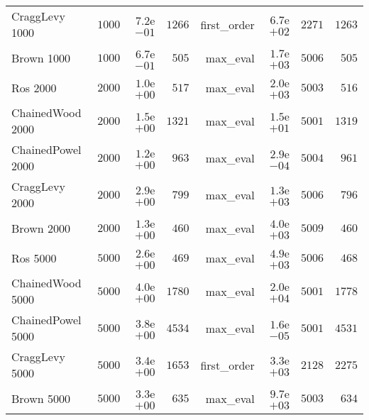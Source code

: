 \begin{longtable}[c]{lrrrrrrr}
CraggLevy 1000 & \( 1000\) & \( 7.2\)e\(-01\) & \( 1266\) & first\_order & \( 6.7\)e\(+02\) & \( 2271\) & \( 1263\) \\
Brown 1000 & \( 1000\) & \( 6.7\)e\(-01\) & \(  505\) & max\_eval & \( 1.7\)e\(+03\) & \( 5006\) & \(  505\) \\
Ros 2000 & \( 2000\) & \( 1.0\)e\(+00\) & \(  517\) & max\_eval & \( 2.0\)e\(+03\) & \( 5003\) & \(  516\) \\
ChainedWood 2000 & \( 2000\) & \( 1.5\)e\(+00\) & \( 1321\) & max\_eval & \( 1.5\)e\(+01\) & \( 5001\) & \( 1319\) \\
ChainedPowel 2000 & \( 2000\) & \( 1.2\)e\(+00\) & \(  963\) & max\_eval & \( 2.9\)e\(-04\) & \( 5004\) & \(  961\) \\
CraggLevy 2000 & \( 2000\) & \( 2.9\)e\(+00\) & \(  799\) & max\_eval & \( 1.3\)e\(+03\) & \( 5006\) & \(  796\) \\
Brown 2000 & \( 2000\) & \( 1.3\)e\(+00\) & \(  460\) & max\_eval & \( 4.0\)e\(+03\) & \( 5009\) & \(  460\) \\
Ros 5000 & \( 5000\) & \( 2.6\)e\(+00\) & \(  469\) & max\_eval & \( 4.9\)e\(+03\) & \( 5006\) & \(  468\) \\
ChainedWood 5000 & \( 5000\) & \( 4.0\)e\(+00\) & \( 1780\) & max\_eval & \( 2.0\)e\(+04\) & \( 5001\) & \( 1778\) \\
ChainedPowel 5000 & \( 5000\) & \( 3.8\)e\(+00\) & \( 4534\) & max\_eval & \( 1.6\)e\(-05\) & \( 5001\) & \( 4531\) \\
CraggLevy 5000 & \( 5000\) & \( 3.4\)e\(+00\) & \( 1653\) & first\_order & \( 3.3\)e\(+03\) & \( 2128\) & \( 2275\) \\
Brown 5000 & \( 5000\) & \( 3.3\)e\(+00\) & \(  635\) & max\_eval & \( 9.7\)e\(+03\) & \( 5003\) & \(  634\) \\
\hline 
\end{longtable}
